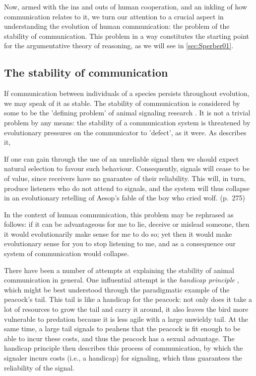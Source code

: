 Now, armed with the ins and outs of human cooperation, and an inkling of how communication relates to it, we turn our attention to a crucial aspect in understanding the evolution of human communication: the problem of the stability of communication.
This problem in a way constitutes the starting point for the argumentative theory of reasoning, as we will see in \cref{sec:Sperber01}.

\subsection{The stability of communication}
\label{sec:S-P08}

If communication between individuals of a species persists throughout evolution, we may speak of it as stable. The stability of communication is considered by some to be the 'defining problem' of animal signaling research \citep{Scott-Phillips08}. It is not a trivial problem by any means: the stability of a communication system is threatened by evolutionary pressures on the communicator to 'defect', as it were. As \citet{Scott-Phillips08} describes it,
\begin{quoting}
    If one can gain through the use of an unreliable signal then we should expect natural selection to favour such behaviour. Consequently, signals will cease to be of value, since receivers have no guarantee of their reliability. This will, in turn, produce listeners who do not attend to signals, and the system will thus collapse in an evolutionary retelling of Aesop’s fable of the boy who cried wolf.
    \hfill (p.~275)
\end{quoting}
In the context of human communication, this problem may be rephrased as follows: if it can be advantageous for me to lie, deceive or mislead someone, then it would evolutionarily make sense for me to do so; yet then it would make evolutionary sense for you to stop listening to me, and as a consequence our system of communication would collapse.

There have been a number of attempts at explaining the stability of animal communication in general. One influential attempt is the \emph{handicap principle} \citep{Zahavi75, Zahavi99}, which might be best understood through the paradigmatic example of the peacock's tail.
This tail is like a handicap for the peacock: not only does it take a lot of resources to grow the tail and carry it around, it also leaves the bird more vulnerable to predation because it is less agile with a large unwieldy tail. At the same time, a large tail signals to peahens that the peacock is fit enough to be able to incur these costs, and thus the peacock has a sexual advantage.
The handicap principle then describes this process of communication, by which the signaler incurs costs (i.e., a handicap) for signaling, which thus guarantees the reliability of the signal.

